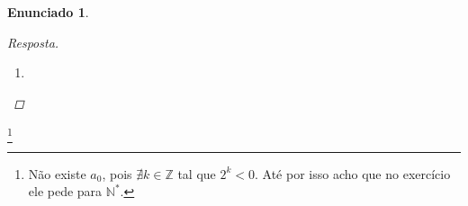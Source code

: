 \documentclass[a4paper,twoside,11pt]{article}
\newtheorem*{enunciado}{Enunciado}
\begin{document}
\begin{enunciado}
\begin{proof}[Resposta]
\begin{enumerate}[label=\alph*)]
            De fato, como $n \in \mathbb{N}^*$, evidentemente $n + 1 \in \mathbb{N}^*$ e, assim, $\dfrac{1}{n+1} > 0$.
            Portanto, segue que $b_{n+1} > b_n$ e assim que $b$ é crescente. \qed

            \item 
        \end{enumerate}
    \end{proof}
\end{enunciado}

\footnote[1]{
    Não existe $a_0$, pois $\nexists k \in \mathbb{Z}$ tal que $2^k < 0$. 
    Até por isso acho que no exercício ele pede para $\mathbb{N}^*$.
}
\end{document}
